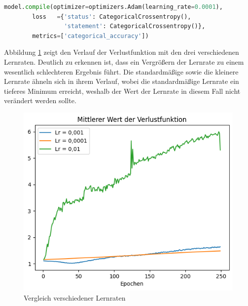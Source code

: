 \begin{lstlisting}[language = python, caption={Wahl der Lernrate},captionpos=b, label = lst:Learnrate, floatplacement=H]
    model.compile(optimizer=optimizers.Adam(learning_rate=0.0001),
        loss   ={'status': CategoricalCrossentropy(), 
                 'statement': CategoricalCrossentropy()},
        metrics=['categorical_accuracy'])
\end{lstlisting}

Abbildung \ref*{fig:LossLR} zeigt den Verlauf der Verlustfunktion mit den drei verschiedenen Lernraten. Deutlich zu erkennen ist, dass ein Vergrößern der Lernrate zu 
einem wesentlich schlechteren Ergebnis führt. Die standardmäßige sowie die kleinere Lernrate ähneln sich in ihrem Verlauf, wobei die standardmäßige Lernrate
ein tieferes Minimum erreicht, weshalb der Wert der Lernrate in diesem Fall nicht verändert werden sollte.

\begin{figure}[H]
    \centering
    \includegraphics[width=.75\textwidth]{abbildungen/Optimierer/LossLR.png}
    \caption{Vergleich verschiedener Lernraten}
    \label{fig:LossLR}
\end{figure}

